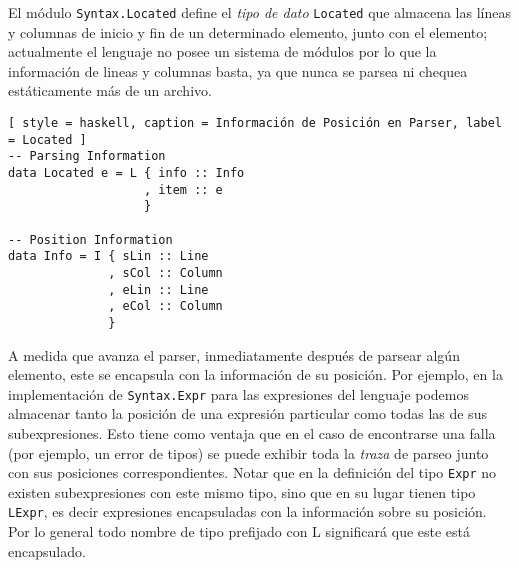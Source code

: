 El módulo \lstinline[style = module]{Syntax.Located} define el \textit{tipo de dato} \lstinline[style = haskell]{Located} que almacena las líneas y columnas de inicio y fin de un determinado elemento, junto con el elemento; actualmente el lenguaje no posee un sistema de módulos por lo que la información de lineas y columnas basta, ya que nunca se parsea ni chequea estáticamente más de un archivo.

\begin{lstlisting}[ style = haskell, caption = Información de Posición en Parser, label = Located ]
-- Parsing Information
data Located e = L { info :: Info
                   , item :: e
                   }

-- Position Information
data Info = I { sLin :: Line
              , sCol :: Column
              , eLin :: Line
              , eCol :: Column
              }
\end{lstlisting}

A medida que avanza el parser, inmediatamente después de parsear algún elemento, este se encapsula con la información de su posición.
Por ejemplo, en la implementación de \lstinline[style = module]{Syntax.Expr} para las expresiones del lenguaje podemos almacenar tanto la posición de una expresión particular como todas las de sus subexpresiones.
Esto tiene como ventaja que en el caso de encontrarse una falla (por ejemplo, un error de tipos) se puede exhibir toda la \textit{traza} de parseo junto con sus posiciones correspondientes.
Notar que en la definición del tipo \lstinline[style = haskell]{Expr} no existen subexpresiones con este mismo tipo, sino que en su lugar tienen tipo \lstinline[style = haskell]{LExpr}, es decir expresiones encapsuladas con la información sobre su posición.
Por lo general todo nombre de tipo prefijado con {\ttfamily \color{Cyan} L} significará que este está encapsulado.

